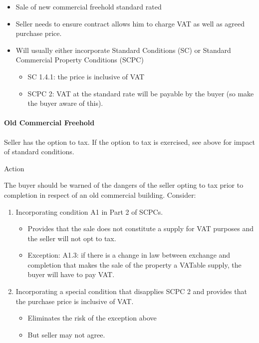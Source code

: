 \documentclass[
]{article}
\providecommand{\tightlist}{%
  \setlength{\itemsep}{0pt}\setlength{\parskip}{0pt}}
\newenvironment{env-23740ccd-d11c-4294-a684-8ca7c2f17646}
{
    \savenotes\tcolorbox[blanker,breakable,left=5pt,borderline west={2pt}{-4pt}{aquamarine}]
}
{
    \endtcolorbox\spewnotes
}
\begin{document}
\begin{itemize}
\tightlist
\item
  Sale of new commercial freehold standard rated
\item
  Seller needs to ensure contract allows him to charge VAT as well as
  agreed purchase price.
\item
  Will usually either incorporate Standard Conditions (SC) or Standard
  Commercial Property Conditions (SCPC)

  \begin{itemize}
  \tightlist
  \item
    SC 1.4.1: the price is inclusive of VAT
  \item
    SCPC 2: VAT at the standard rate will be payable by the buyer (so
    make the buyer aware of this).
  \end{itemize}
\end{itemize}

\hypertarget{old-commercial-freehold}{%
\paragraph{Old Commercial Freehold}\label{old-commercial-freehold}}

Seller has the option to tax. If the option to tax is exercised, see
above for impact of standard conditions.

\begin{env-23740ccd-d11c-4294-a684-8ca7c2f17646}

Action

The buyer should be warned of the dangers of the seller opting to tax
prior to completion in respect of an old commercial building. Consider:

\begin{enumerate}
\tightlist
\item
  Incorporating condition A1 in Part 2 of SCPCs.

  \begin{itemize}
  \tightlist
  \item
    Provides that the sale does not constitute a supply for VAT purposes
    and the seller will not opt to tax.
  \item
    Exception: A1.3: if there is a change in law between exchange and
    completion that makes the sale of the property a VATable supply, the
    buyer will have to pay VAT.
  \end{itemize}
\item
  Incorporating a special condition that disapplies SCPC 2 and provides
  that the purchase price is inclusive of VAT.

  \begin{itemize}
  \tightlist
  \item
    Eliminates the risk of the exception above
  \item
    But seller may not agree.
  \end{itemize}
\end{enumerate}

\end{env-23740ccd-d11c-4294-a684-8ca7c2f17646}
\end{document}
